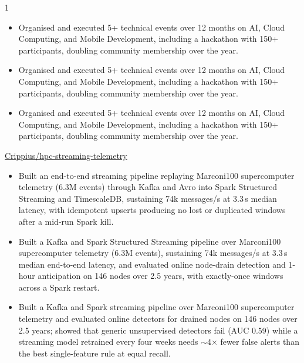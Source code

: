 \documentclass[10pt,a4paper,ragged2e,withhyper]{cv}
\begin{document}
\begin{paracol}{1}
\begin{itemize}
    \ifde
        \item Organised and executed 5+ technical events over 12 months on AI, Cloud Computing, and Mobile Development, including a hackathon with 150+ participants, doubling community membership over the year.
    \else
        \ifhpc
            \item Organised and executed 5+ technical events over 12 months on AI, Cloud Computing, and Mobile Development, including a hackathon with 150+ participants, doubling community membership over the year.
        \else
            \item Organised and executed 5+ technical events over 12 months on AI, Cloud Computing, and Mobile Development, including a hackathon with 150+ participants, doubling community membership over the year.
        \fi
    \fi

\end{itemize}

\medskip



 {}
{
}
{\href{https://github.com/Crippius/hpc-streaming-telemetry}
{Crippius/hpc-streaming-telemetry}}
\begin{itemize}

    \ifde
        \item Built an end-to-end streaming pipeline replaying Marconi100 supercomputer telemetry (6.3M events) through Kafka and Avro into Spark Structured Streaming and TimescaleDB, sustaining 74k messages/s at 3.3\,s median latency, with idempotent upserts producing no lost or duplicated windows after a mid-run Spark kill.
    \else
        \ifhpc
            \item Built a Kafka and Spark Structured Streaming pipeline over Marconi100 supercomputer telemetry (6.3M events), sustaining 74k messages/s at 3.3\,s median end-to-end latency, and evaluated online node-drain detection and 1-hour anticipation on 146 nodes over 2.5 years, with exactly-once windows across a Spark restart.
        \else
            \item Built a Kafka and Spark streaming pipeline over Marconi100 supercomputer telemetry and evaluated online detectors for drained nodes on 146 nodes over 2.5 years; showed that generic unsupervised detectors fail (AUC 0.59) while a streaming model retrained every four weeks needs $\sim$4$\times$ fewer false alerts than the best single-feature rule at equal recall.
        \fi
    \fi


\end{itemize}
\end{paracol}
\end{document}
